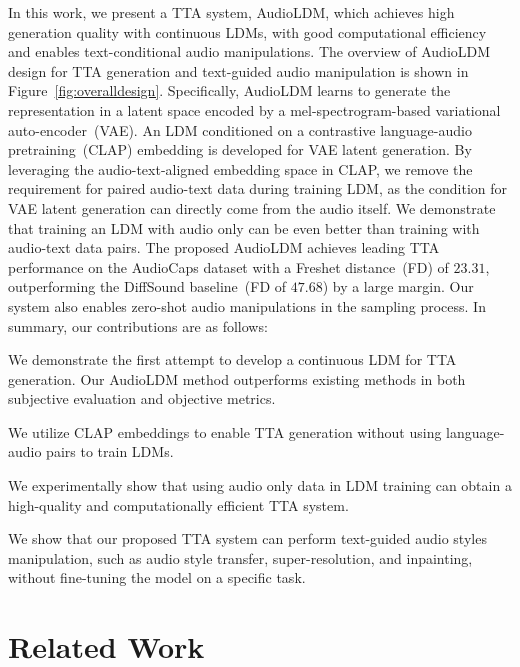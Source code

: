 \documentclass{article}
\begin{document}
In this work, we present a TTA system, AudioLDM, which achieves high generation quality with continuous LDMs, with good computational efficiency and enables text-conditional audio manipulations.
The overview of AudioLDM design for TTA generation and text-guided audio manipulation is shown in Figure~\ref{fig:overalldesign}. 
Specifically, AudioLDM learns to generate the representation in a latent space encoded by a mel-spectrogram-based variational auto-encoder~(VAE). An LDM conditioned on a contrastive language-audio pretraining~(CLAP) embedding is developed for VAE latent generation. By leveraging the audio-text-aligned embedding space in CLAP, we remove the requirement for paired audio-text data during training LDM, as the condition for VAE latent generation can directly come from the audio itself. We demonstrate that training an LDM with audio only can be even better than training with audio-text data pairs. The proposed AudioLDM achieves leading TTA performance on the AudioCaps dataset with a Freshet distance~(FD) of $23.31$, outperforming the DiffSound baseline~(FD of $47.68$) by a large margin. Our system also enables zero-shot audio manipulations in the sampling process. In summary, our contributions are as follows:
\begin{list}{}{\leftmargin=1em}
    \setlength{\itemsep}{1pt}
    \setlength{\parskip}{0pt}
    \item We demonstrate the first attempt to develop a continuous LDM for TTA generation. Our AudioLDM method outperforms existing methods in both subjective evaluation and objective metrics.
    \item We utilize CLAP embeddings to enable TTA generation without using language-audio pairs to train LDMs. 
    \item We experimentally show that using audio only data in LDM training can obtain a high-quality and computationally efficient TTA system. 
    \item We show that our proposed TTA system can perform text-guided audio styles manipulation, such as audio style transfer, super-resolution, and inpainting, without fine-tuning the model on a specific task.
\end{list}










\section{Related Work}
\label{Background}
\end{document}
